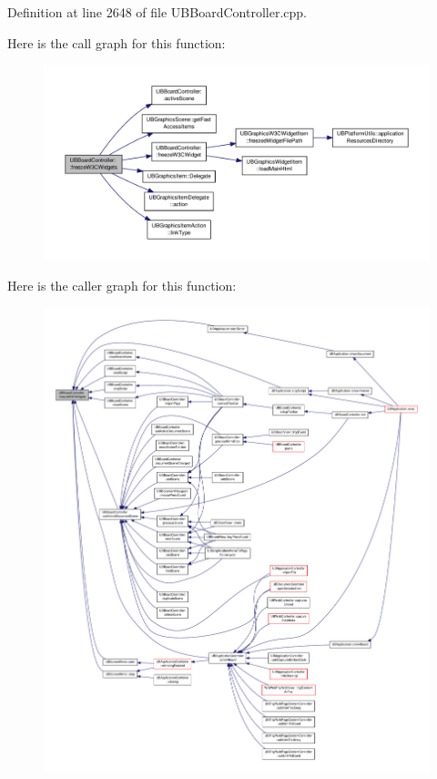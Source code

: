 Definition at line 2648 of file U\-B\-Board\-Controller.\-cpp.



Here is the call graph for this function\-:
\nopagebreak
\begin{figure}[H]
\begin{center}
\leavevmode
\includegraphics[width=350pt]{d7/d62/class_u_b_board_controller_a4e526bf1704cc013539413d792c65d6a_cgraph}
\end{center}
\end{figure}




Here is the caller graph for this function\-:
\nopagebreak
\begin{figure}[H]
\begin{center}
\leavevmode
\includegraphics[width=350pt]{d7/d62/class_u_b_board_controller_a4e526bf1704cc013539413d792c65d6a_icgraph}
\end{center}
\end{figure}


